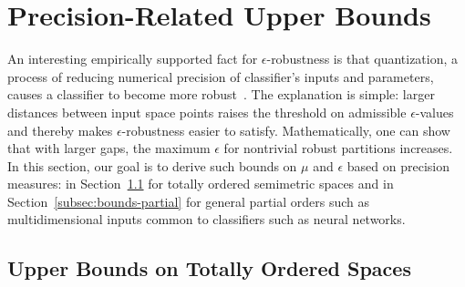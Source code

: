 \section{Precision-Related Upper Bounds}
\label{sec:upper-bounds}

An interesting empirically supported fact for $\epsilon$-robustness is that quantization, a process of reducing numerical precision of classifier's inputs and parameters, causes a classifier to become more robust~\cite{xiao2023robustmq,shrestha2024properties,duncan2020relative}. The explanation is simple: larger distances between input space points raises the threshold on admissible $\epsilon$-values and thereby makes $\epsilon$-robustness easier to satisfy. Mathematically, one can show that with larger gaps, the maximum $\epsilon$ for nontrivial robust partitions increases. In this section, our goal is to derive such bounds on $\mu$ and $\epsilon$ based on precision measures: in Section~\ref{subsec:bounds-total} for totally ordered semimetric spaces and in Section~\ref{subsec:bounds-partial} for general partial orders such as multidimensional inputs common to classifiers such as neural networks.

\subsection{Upper Bounds on Totally Ordered Spaces}
\label{subsec:bounds-total}

